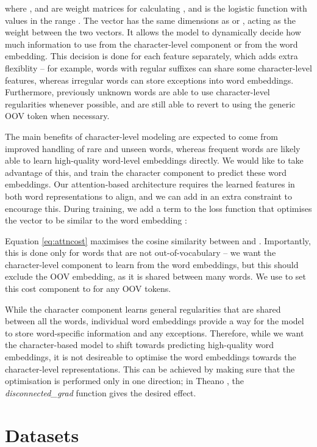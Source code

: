 \documentclass[11pt]{article}
\begin{document}
\noindent where ,  and  are weight matrices for calculating , and  is the logistic function with values in the range . The vector  has the same dimensions as  or , acting as the weight between the two vectors. It allows the model to dynamically decide how much information to use from the character-level component or from the word embedding. This decision is done for each feature separately, which adds extra flexiblity -- for example, words with regular suffixes can share some character-level features, whereas irregular words can store exceptions into word embeddings.
Furthermore, previously unknown words are able to use character-level regularities whenever possible, and are still able to revert to using the generic OOV token when necessary.

The main benefits of character-level modeling are expected to come from improved handling of rare and unseen words, whereas frequent words are likely able to learn high-quality word-level embeddings directly. We would like to take advantage of this, and train the character component to predict these word embeddings.
Our attention-based architecture requires the learned features in both word representations to align, and we can add in an extra constraint to encourage this. During training, we add a term to the loss function that optimises the vector  to be similar to the word embedding :



\noindent Equation \ref{eq:attncost} maximises the cosine similarity between  and . Importantly, this is done only for words that are not out-of-vocabulary -- we want the character-level component to learn from the word embeddings, but this should exclude the OOV embedding, as it is shared between many words. We use  to set this cost component to  for any OOV tokens.

While the character component learns general regularities that are shared between all the words, individual word embeddings provide a way for the model to store word-specific information and any exceptions.
Therefore, while we want the character-based model to shift towards predicting high-quality word embeddings, it is not desireable to optimise the word embeddings towards the character-level representations. 
This can be achieved by making sure that the optimisation is performed only in one direction; in Theano \cite{Bergstra2010}, the \textit{disconnected\_grad} function gives the desired effect.

\section{Datasets}
\end{document}
